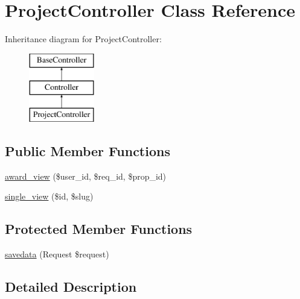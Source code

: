 \hypertarget{class_responsive_1_1_http_1_1_controllers_1_1_project_controller}{}\section{Project\+Controller Class Reference}
\label{class_responsive_1_1_http_1_1_controllers_1_1_project_controller}
Inheritance diagram for Project\+Controller\+:\begin{figure}[H]
\begin{center}
\leavevmode
\includegraphics[height=3.000000cm]{class_responsive_1_1_http_1_1_controllers_1_1_project_controller}
\end{center}
\end{figure}
\subsection*{Public Member Functions}
\begin{DoxyCompactItemize}
\item 
\mbox{\hyperlink{class_responsive_1_1_http_1_1_controllers_1_1_project_controller_ab1ed025f827e659688e648170697fbf2}{award\+\_\+view}} (\$user\+\_\+id, \$req\+\_\+id, \$prop\+\_\+id)
\item 
\mbox{\hyperlink{class_responsive_1_1_http_1_1_controllers_1_1_project_controller_a75bba3b2facab10a4744ac5d8cf333da}{single\+\_\+view}} (\$id, \$slug)
\end{DoxyCompactItemize}
\subsection*{Protected Member Functions}
\begin{DoxyCompactItemize}
\item 
\mbox{\hyperlink{class_responsive_1_1_http_1_1_controllers_1_1_project_controller_a39992cc1c190dd16b2de573a70a7f5dc}{savedata}} (Request \$request)
\end{DoxyCompactItemize}


\subsection{Detailed Description}


